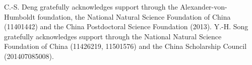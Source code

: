 \documentclass{aptpub}
\numberwithin{equation}{section}
\begin{document}
\acks
C.-S. Deng gratefully acknowledges support through the Alexander-von-Humboldt foundation, the National Natural Science Foundation of China (11401442) and the China Postdoctoral
Science Foundation (2013). Y.-H. Song gratefully acknowledges support through
the National Natural Science Foundation of China (11426219, 11501576)
and the China Scholarship Council (201407085008).


%
%
%
%
\end{document}
